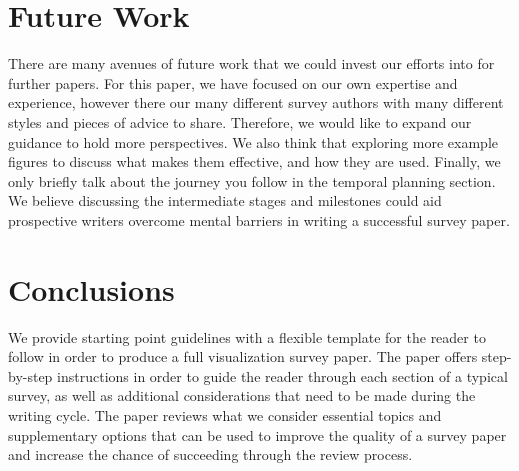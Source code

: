 \section{Future Work}
There are many avenues of future work that we could invest our efforts into for further papers. For this paper, we have focused on our own expertise and experience, however there our many different survey authors with many different styles and pieces of advice to share. Therefore, we would like to expand our guidance to hold more perspectives. We also think that exploring more example figures to discuss what makes them effective, and how they are used. Finally, we only briefly talk about the journey you follow in the temporal planning section. We believe discussing the intermediate stages and milestones could aid prospective writers overcome mental barriers in writing a successful survey paper.

\section{Conclusions}
We provide starting point guidelines with a flexible template for the reader to follow in order to produce a full visualization survey paper. The paper offers step-by-step instructions in order to guide the reader through each section of a typical survey, as well as additional considerations that need to be made during the writing cycle. The paper reviews what we consider essential topics and supplementary options that can be used to improve the quality of a survey paper and increase the chance of succeeding through the review process.